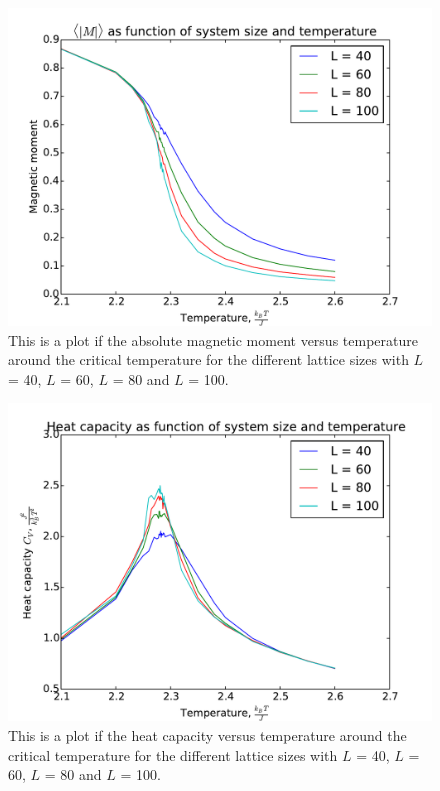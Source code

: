 \begin{figure}[H]
\includegraphics[width=\linewidth]{../results/4e/4e_mag}\caption{This is a plot if the absolute magnetic moment versus temperature around the critical temperature for the different lattice sizes with $L$ = 40, $L$ = 60, $L$ = 80 and $L$ = 100.}\label{fig:4e_magnetic}
\end{figure}

\begin{figure}[H]
\includegraphics[width=\linewidth]{../results/4e/4e_Cv}\caption{This is a plot if the heat capacity versus temperature around the critical temperature for the different lattice sizes with $L$ = 40, $L$ = 60, $L$ = 80 and $L$ = 100.}\label{fig:4e_heat_capa}
\end{figure}

